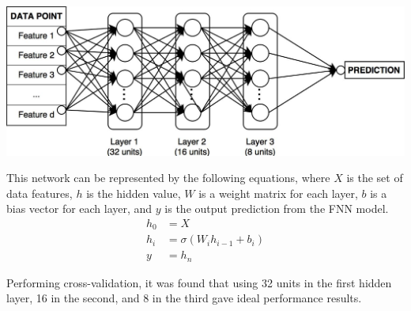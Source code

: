 \documentclass[10pt]{article}
\begin{document}
\begin{multicols}{2}
		\begin{center}
            \captionsetup{type=figure}
			\includegraphics[scale=0.15]{NeuralNet/fig_nn_01} \\
			\label{fig:fig_nn_model}
		\end{center}
	
		This network can be represented by the following equations, where \(X\) is the set of data features, \(h\) is the hidden value, \(W\) is a weight matrix for each layer, \(b\) is a bias vector for each layer, and \(y\) is the output prediction from the FNN model.
		\begin{align}
			h_{0} &= X \nonumber \\
			h_{i} &= \sigma(W_{i}h_{i-1} + b_{i}) \nonumber \\
			y &= h_{n} \nonumber
		\end{align}
	
		Performing cross-validation, it was found that using 32 units in the first hidden layer, 16 in the second, and 8 in the third gave ideal performance results.
		

\end{multicols}
\end{document}
